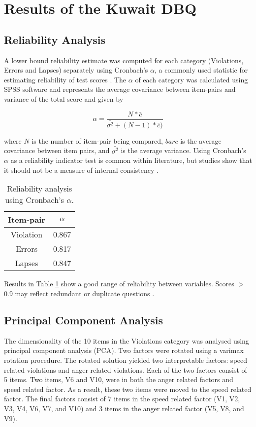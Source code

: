 \documentclass[preprint,12pt,a4paper,authoryear]{elsarticle}
\begin{document}
\section{Results of the Kuwait DBQ}

\subsection{Reliability Analysis}
A lower bound reliability estimate was computed for each category (Violations, Errors and Lapses) separately using Cronbach's $\alpha$,  a commonly used statistic for estimating reliability of test scores \citep{Warrens2014}. The $\alpha$ of each category was calculated using SPSS software and represents the average covariance between item-pairs and variance of the total score and given by

\begin{equation}
\label{eq:alpha}
\alpha = \frac{N*\bar{c}}{\bar{\sigma^{2}}+(N-1)*\bar{c})}
\end{equation}

\noindent
where $N$ is the number of item-pair being compared, $bar{c}$ is the average covariance between item pairs, and $\bar{\sigma^{2}}$ is the average variance. Using Cronbach's $\alpha$ as a reliability indicator test is common within literature, but studies show that it should not be a measure of internal consistency \citep{Sijtsma2009, Tavokol2011}.

\begin{table}[H]
\centering
\caption{Reliability analysis using Cronbach's $\alpha$.}
\label{tab:alpha}
\begin{tabular}{@{}cc@{}}
\toprule
\textbf{Item-pair} & \textbf{$\alpha$} \\ \midrule
Violation & 0.867 \\
Errors & 0.817 \\
Lapses & 0.847 \\ \bottomrule
\end{tabular}
\end{table} 

Results in Table \ref{tab:alpha} show a good range of reliability between variables. Scores $>$ 0.9 may reflect redundant or duplicate questions \citep{Streiner2003}.

\subsection{Principal Component Analysis}
The dimensionality of the 10 items in the Violations category was analysed using principal component analysis (PCA).   Two factors were rotated using a varimax rotation procedure. The rotated solution yielded two interpretable factors: speed related violations and anger related violations. Each of the two factors consist of 5 items. Two items, V6 and V10, were in both the anger related factors and speed related factor. As a result, these two items were moved to the speed related factor. The final factors consist of 7 items in the speed related factor (V1, V2, V3, V4, V6, V7, and V10)  and 3 items in the anger related factor (V5, V8, and V9). 
\end{document}
